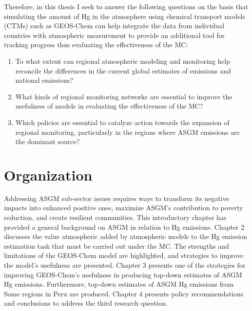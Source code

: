 \begin{flushleft}
 Therefore, in this thesis I seek to answer the following questions on the basis that simulating the amount of Hg in the atmosphere using chemical transport models (CTMs) such as GEOS-Chem can help integrate the data from individual countries with atmospheric measurement to provide an additional tool for tracking progress thus evaluating the effectiveness of the MC:
\begin{enumerate}
  \item To what extent can regional atmospheric modeling and monitoring help reconcile the differences in the current global estimates of emissions and national emissions?
  \item What kinds of regional monitoring networks are essential to improve the usefulness of models in evaluating the effectiveness of the MC?
  \item Which policies are essential to catalyze action towards the expansion of regional monitoring, particularly in the regions where ASGM emissions are the dominant source?
\end{enumerate}
\end{flushleft}



 
\section{Organization}
Addressing ASGM sub-sector issues requires ways to transform its negative impacts into enhanced positive ones, maximize ASGM's contribution to poverty reduction, and create resilient communities. This introductory chapter has provided a general background on ASGM in relation to Hg emissions. Chapter 2 discusses the value atmospheric added by atmospheric models to the Hg emission estimation task that must be carried out under the MC. The strengths and limitations of the GEOS-Chem model are highlighted, and strategies to improve the model's usefulness are presented. Chapter 3 presents one of the strategies for improving GEOS-Chem's usefulness in producing top-down estimates of ASGM Hg emissions. Furthermore, top-down estimates of ASGM Hg emissions from Some regions in Peru are produced. Chapter 4 presents policy recommendations and conclusions to address the third research question.



